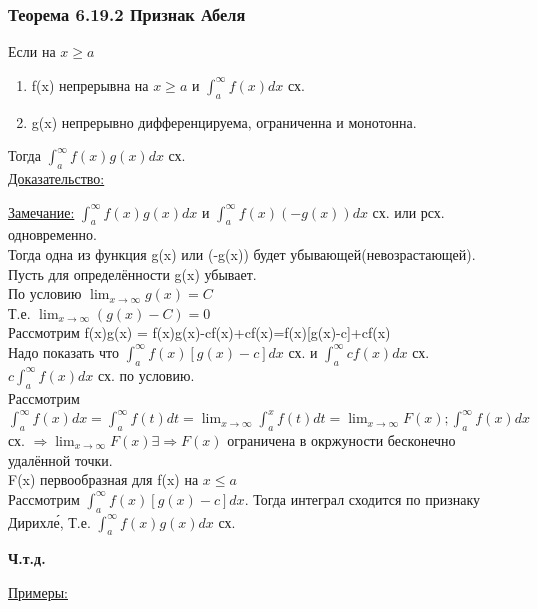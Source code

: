 \documentclass[12pt]{article}
\begin{document}
    \subsubsection*{Теорема 6.19.2 Признак Абеля}\label{th:6.19.2}
    Если на $x\geq a$\par\noindent
    \begin{enumerate}
        \item f(x) непрерывна на $x \geq a$ и $\int_{a}^{\infty}f(x)dx$ сх.
        \item g(x) непрерывно дифференцируема, ограниченна и монотонна.
    \end{enumerate}
    Тогда $\int_{a}^{\infty}f(x)g(x)dx$ сх.\\
    \underline{Доказательство:}
    \begin{adjustwidth}{1.5em}{1.5em}
        \underline{Замечание:} $\int_{a}^{\infty}f(x)g(x)dx$ и $\int_{a}^{\infty}f(x)(-g(x))dx$ сх. или рсх. одновременно.\\
        Тогда одна из функция g(x) или (-g(x)) будет убывающей(невозрастающей).\\
        Пусть для определённости g(x) убывает.\\
        По условию $\lim_{x \to \infty}g(x)=C$\\
        Т.е. $\lim_{x \to \infty}(g(x)-C)=0$\\
        Рассмотрим f(x)g(x) = f(x)g(x)-cf(x)+cf(x)=f(x)[g(x)-c]+cf(x)\\
        Надо показать что $\int_{a}^{\infty}f(x)[g(x)-c]dx$ сх. и $\int_{a}^{\infty}cf(x)dx$ сх.\\
        $c\int_{a}^{\infty}f(x)dx$ сх. по условию.\\
        Рассмотрим $\int_{a}^{\infty}f(x)dx=\int_{a}^{\infty}f(t)dt=\lim_{x \to \infty}\int_{a}^{x}f(t)dt=
        \lim_{x \to \infty}F(x); \int_{a}^{\infty}f(x)dx$ сх.  $\Rightarrow \lim_{x \to \infty}F(x) \exists \Rightarrow F(x)$ ограничена в окржуности бесконечно удалённой точки.\\
        F(x) первообразная для f(x) на $x \leq a$\\
        Рассмотрим $\int_{a}^{\infty}f(x)[g(x)-c]dx.$ Тогда интеграл сходится по признаку Дирихле́, Т.е. $\int_{a}^{\infty}f(x)g(x)dx$ сх.\\
    \end{adjustwidth}
    \begin{center}
        \textbf{Ч.т.д.}
    \end{center}
    \underline{Примеры:}\\
\end{document}
